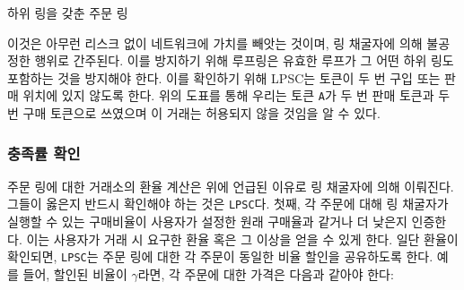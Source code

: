 \documentclass{article}
\makeatletter
\newenvironment{figurehere}
{\def\@captype{figure}}
{}
\makeatother
\begin{document}
\begin{multicols}{2}
\begin{center}
\begin{figurehere}
		
		\caption{하위 링을 갖춘 주문 링}
		\label{fig:subring}
	\end{figurehere}
\end{center}

이것은 아무런 리스크 없이 네트워크에 가치를 빼앗는 것이며, 링 채굴자에 의해 불공정한 행위로 간주된다. 이를 방지하기 위해 루프링은 유효한 루프가 그 어떤 하위 링도 포함하는 것을 방지해야 한다. 이를 확인하기 위해 LPSC는 토큰이 두 번 구입 또는 판매 위치에 있지 않도록 한다. 위의 도표를 통해 우리는 토큰 \verb|A|가 두 번 판매 토큰과 두 번 구매 토큰으로 쓰였으며 이 거래는 허용되지 않을 것임을 알 수 있다.

\subsubsection{충족률 확인\label{sec:fill_rate_check}}

주문 링에 대한 거래소의 환율 계산은 위에 언급된 이유로 링 채굴자에 의해 이뤄진다. 그들이 옳은지 반드시 확인해야 하는 것은 \verb|LPSC|다. 첫째, 각 주문에 대해 링 채굴자가 실행할 수 있는 구매비율이 사용자가 설정한 원래 구매율과 같거나 더 낮은지 인증한다. 이는 사용자가 거래 시 요구한 환율 혹은 그 이상을 얻을 수 있게 한다. 일단 환율이 확인되면, \verb|LPSC|는 주문 링에 대한 각 주문이 동일한 비율 할인을 공유하도록 한다. 예를 들어, 할인된 비율이 $\gamma$라면, 각 주문에 대한 가격은 다음과 같아야 한다:


\end{multicols}
\end{document}
